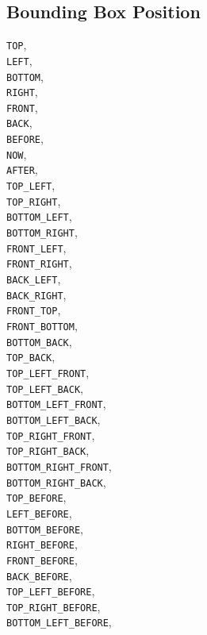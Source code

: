 \documentclass[10pt]{article}
\begin{document}
\subsection{Bounding Box Position}

	\verb+TOP+,\\
	\verb+LEFT+,\\
	\verb+BOTTOM+,\\
	\verb+RIGHT+,\\
	\verb+FRONT+,\\
	\verb+BACK+,\\
	\verb+BEFORE+,\\
	\verb+NOW+,\\
	\verb+AFTER+,\\
	\verb+TOP_LEFT+,\\
	\verb+TOP_RIGHT+,\\
	\verb+BOTTOM_LEFT+,\\
	\verb+BOTTOM_RIGHT+,\\
	\verb+FRONT_LEFT+,\\
	\verb+FRONT_RIGHT+,\\
	\verb+BACK_LEFT+,\\
	\verb+BACK_RIGHT+,\\
	\verb+FRONT_TOP+,\\
	\verb+FRONT_BOTTOM+,\\
	\verb+BOTTOM_BACK+,\\
	\verb+TOP_BACK+,\\
	\verb+TOP_LEFT_FRONT+,\\
	\verb+TOP_LEFT_BACK+,\\
	\verb+BOTTOM_LEFT_FRONT+,\\
	\verb+BOTTOM_LEFT_BACK+,\\
	\verb+TOP_RIGHT_FRONT+,\\
	\verb+TOP_RIGHT_BACK+,\\
	\verb+BOTTOM_RIGHT_FRONT+,\\
	\verb+BOTTOM_RIGHT_BACK+,\\
	\verb+TOP_BEFORE+,\\
	\verb+LEFT_BEFORE+,\\
	\verb+BOTTOM_BEFORE+,\\
	\verb+RIGHT_BEFORE+,\\
	\verb+FRONT_BEFORE+,\\
	\verb+BACK_BEFORE+,\\
	\verb+TOP_LEFT_BEFORE+,\\
	\verb+TOP_RIGHT_BEFORE+,\\
	\verb+BOTTOM_LEFT_BEFORE+,\\
\end{document}
